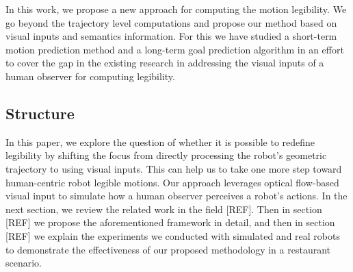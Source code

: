 In this work, we propose a new approach for computing the motion legibility. We go beyond the trajectory level computations and propose our method based on visual inputs and semantics information. For this we have studied a short-term motion prediction method and a long-term goal prediction algorithm in an effort to cover the gap in the existing research in addressing the visual inputs of a human observer for computing legibility. 


\subsection{Structure}

In this paper, we explore the question of whether it is possible to redefine legibility by shifting the focus from directly processing the robot's geometric trajectory to using visual inputs. This can help us to take one more step toward human-centric robot legible motions.
Our approach leverages optical flow-based visual input to simulate how a human observer perceives a robot’s actions. 
%
In the next section, we review the related work in the field [REF]. Then in section [REF] we propose the aforementioned framework in detail, and then in section [REF] we explain the experiments we conducted with simulated and real robots to demonstrate the effectiveness of our proposed methodology in a restaurant scenario.

